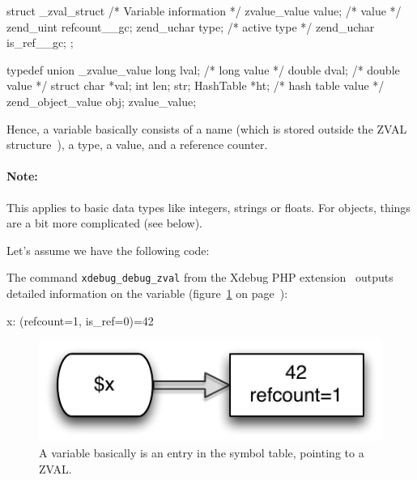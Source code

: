 \begin{ccode}
struct _zval_struct {
  /* Variable information */
  zvalue_value value;       /* value */
  zend_uint refcount__gc;
  zend_uchar type;          /* active type */
  zend_uchar is_ref__gc;
};

typedef union _zvalue_value {
  long lval;     /* long value */
  double dval;   /* double value */
  struct {
    char *val;
    int len;
  } str;
  HashTable *ht;  /* hash table value */
  zend_object_value obj;
} zvalue_value;
\end{ccode}

Hence, a variable basically consists of a name (which is stored outside the ZVAL structure~\cite{php-extensions-zval}), a type, a value, and a reference counter.

\paragraph{Note:} This applies to basic data types like integers, strings or floats. For objects, things are a bit more complicated (see below).

Let's assume we have the following code:


The command \texttt{xdebug\_debug\_zval} from the Xdebug PHP extension~\cite{xdebug-functions} outputs detailed information on the variable (figure~\ref{fig:simple-variable} on page~\pageref{fig:simple-variable}):

\begin{textcode}
x: (refcount=1, is_ref=0)=42
\end{textcode}

\begin{figure}[htb]
  \begin{center}
    \includegraphics[scale=0.8]{images/x_42}
    \caption{A variable basically is an entry in the symbol table, pointing to a ZVAL.}
    \label{fig:simple-variable}
  \end{center}
\end{figure}

